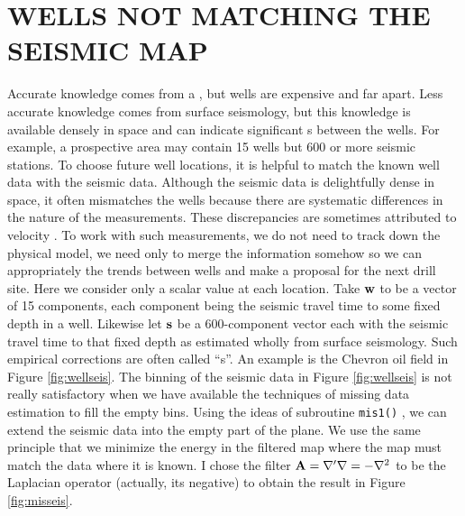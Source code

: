 \section{WELLS NOT MATCHING THE SEISMIC MAP}
Accurate knowledge comes from a ,
but wells are expensive and far apart.
Less accurate knowledge comes from surface seismology,
but this knowledge is available densely in space
and can indicate significant s between the wells.
For example,
a prospective area may contain 15 wells
but 600 or more seismic stations.
To choose future well locations,
it is helpful to match the known well data with the seismic data.
Although the seismic data is delightfully dense in space,
it often mismatches the wells
because there are systematic differences in the nature of the measurements.
These discrepancies
are sometimes attributed to velocity .
To work with such measurements,
we do not need to track down the physical model,
we need only to merge the information somehow
so we can appropriately  the trends between wells
and make a proposal for the next drill site.
Here we consider only a scalar value at each location.
Take $\bold w$ to be a vector of 15 components,
each component being the seismic travel time to some fixed depth in a well.
Likewise let $\bold s$ be a 600-component vector
each with the seismic travel time to that fixed depth
as estimated wholly from surface seismology.
Such empirical corrections are often called ``s''.
An example is the Chevron oil field in Figure \ref{fig:wellseis}.
The binning of the seismic data in Figure \ref{fig:wellseis}
is not really satisfactory when we have available
the techniques of missing data estimation
to fill the empty bins.
Using the ideas of subroutine \texttt{mis1()} ,
we can extend the seismic data into the empty part of the plane.
We use the same principle that we minimize the energy in 
the filtered map where the map must match the data where it is known.
I chose the filter $\bold A = \nabla'\nabla=-\nabla^2$
to be the Laplacian operator (actually, its negative)
to obtain the result in Figure \ref{fig:misseis}.

